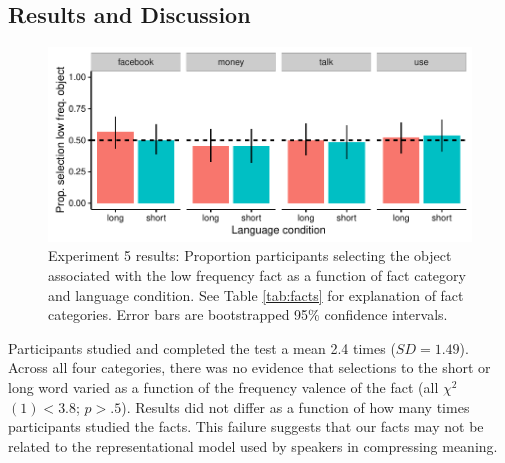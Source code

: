 \subsection{Results and Discussion}
  \begin{figure}[t!]
 \begin{center}
  \includegraphics[width=6in]{figs/fact_plots.pdf}
  \caption{\label{fig:fact_plots} Experiment 5 results: Proportion participants selecting the object associated with the low frequency fact as a function of fact category and language condition. See Table \ref{tab:facts} for explanation of fact categories. Error bars are bootstrapped 95\% confidence intervals.}
 \end{center}
\end{figure}
Participants studied and completed the test a mean 2.4 times ($SD = 1.49$).  Across all four categories, there was no evidence that selections to the short or long word varied as a function of the frequency valence of the fact (all ${\chi}^2$$(1) < 3.8$; $p > .5$). Results did not differ as a function of how many times participants studied the facts.  This failure suggests that our facts may not be related to the representational model used by speakers in compressing meaning. 



